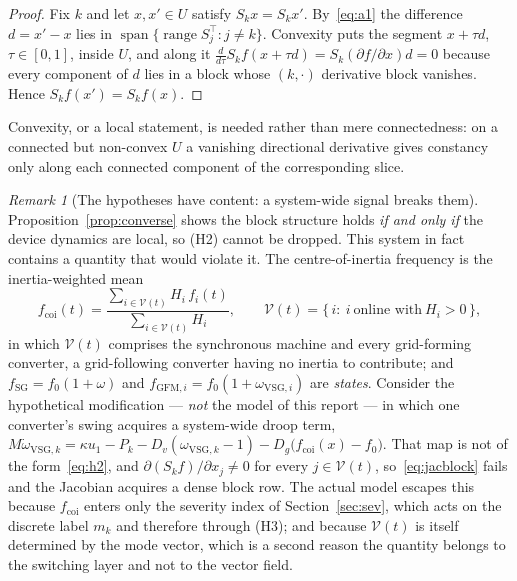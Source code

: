 \documentclass[12pt,a4paper]{article}
\theoremstyle{remark}
\newtheorem{remark}{Remark}
\begin{document}
\begin{proof}
Fix $k$ and let $x,x'\in U$ satisfy $S_kx=S_kx'$. By~\eqref{eq:a1} the difference
$d=x'-x$ lies in $\operatorname{span}\bigl\{\operatorname{range}S_j^{\top}:j\neq
k\bigr\}$. Convexity puts the segment $x+\tau d$, $\tau\in[0,1]$, inside $U$, and
along it $\tfrac{d}{d\tau}S_kf(x+\tau d)=S_k(\partial f/\partial x)d=0$ because
every component of $d$ lies in a block whose $(k,\cdot)$ derivative block
vanishes. Hence $S_kf(x')=S_kf(x)$.
\end{proof}

Convexity, or a local statement, is needed rather than mere connectedness: on a
connected but non-convex $U$ a vanishing directional derivative gives constancy
only along each connected component of the corresponding slice.

\begin{remark}[The hypotheses have content: a system-wide signal breaks them]
\label{rem:coi}
Proposition~\ref{prop:converse} shows the block structure holds \emph{if and only
if} the device dynamics are local, so (H2) cannot be dropped. This system in fact
contains a quantity that would violate it. The centre-of-inertia frequency is the
inertia-weighted mean
\begin{equation}
  f_{\mathrm{coi}}(t)
  =\frac{\sum_{i\in\mathcal{V}(t)}H_i\,f_i(t)}{\sum_{i\in\mathcal{V}(t)}H_i},
  \qquad
  \mathcal{V}(t)=\{\,i:\ i\ \text{online with}\ H_i>0\,\},
  \label{eq:coidef}
\end{equation}
in which $\mathcal{V}(t)$ comprises the synchronous machine and every
grid-forming converter, a grid-following converter having no inertia to
contribute; and $f_{\mathrm{SG}}=f_0(1+\omega)$ and
$f_{\mathrm{GFM},i}=f_0(1+\omega_{\mathrm{VSG},i})$ are \emph{states}. Consider
the hypothetical modification --- \emph{not} the model of this report --- in which
one converter's swing acquires a system-wide droop term,
$M\dot\omega_{\mathrm{VSG},k}=\kappa u_1-P_k-D_v(\omega_{\mathrm{VSG},k}-1)
-D_g\bigl(f_{\mathrm{coi}}(x)-f_0\bigr)$. That map is not of the
form~\eqref{eq:h2}, and $\partial(S_kf)/\partial x_j\neq0$ for every
$j\in\mathcal{V}(t)$, so~\eqref{eq:jacblock} fails and the Jacobian acquires a
dense block row. The actual model escapes this because $f_{\mathrm{coi}}$ enters
only the severity index of Section~\ref{sec:sev}, which acts on the discrete
label $m_k$ and therefore through (H3); and because $\mathcal{V}(t)$ is itself
determined by the mode vector, which is a second reason the quantity belongs to
the switching layer and not to the vector field.
\end{remark}
\end{document}
